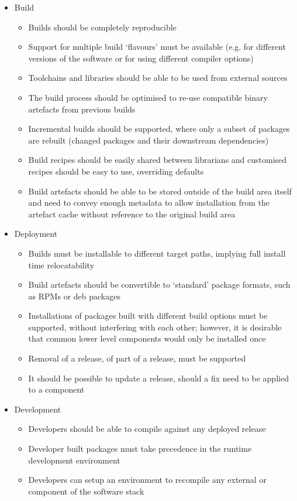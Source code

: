 \documentclass{webofc}
\begin{document}
\begin{itemize}
    \item Build
    \begin{itemize}
        \item Builds should be completely reproducible
        \item Support for multiple build `flavours' must be available
            (e.g. for different versions of the software or for 
            using different compiler options)
        \item Toolchains and libraries should be able to be used from
            external sources
        \item The build process should be optimised to re-use compatible
            binary artefacts from previous builds
        \item Incremental builds should be supported, where only a subset
            of packages are rebuilt (changed packages and their downstream
            dependencies)
        \item Build recipes should be easily shared between librarians
            and customised recipes should be easy to use, overriding defaults
        \item Build artefacts should be able to be stored outside of the
            build area itself and need to convey enough metadata to allow
            installation from the artefact cache without reference to the
            original build area
    \end{itemize}
    \item Deployment
    \begin{itemize}
        \item Builds must be installable to different target paths, implying
            full install time relocatability
        \item Build artefacts should be convertible to `standard' package
            formats, such as RPMs or deb packages
        \item Installations of packages built with different build options
            must be supported, without interfering with each other; however,
            it is desirable that common lower level components would only
            be installed once
        \item Removal of a release, of part of a release, must be supported
        \item It should be possible to update a release, should a fix need to
            be applied to a component
    \end{itemize}
    \item Development
    \begin{itemize}
        \item Developers should be able to compile against any deployed release
        \item Developer built packages must take precedence in the runtime
            development environment
        \item Developers can setup an environment to recompile any external
            or component of the software stack
    \end{itemize}
\end{itemize}
\end{document}
